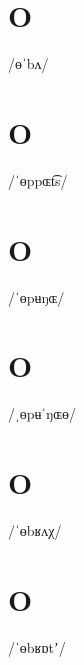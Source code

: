 \documentclass[10pt,a4paper,twoside]{book}
\begin{document}
\section*{O}

\begin{multicols}{3}
 {/ɵˈbʌ/} {}
\end{multicols}

\section*{O}

\begin{multicols}{3}
 {/ˈɵppɶt͡s/} {}
\end{multicols}

\section*{O}

\begin{multicols}{3}
 {/ˈɵpʉŋɶ/} {}
\end{multicols}

\section*{O}

\begin{multicols}{3}
 {/ˌɵpʉˈŋɶɵ/} {}
\end{multicols}

\section*{O}

\begin{multicols}{3}
 {/ˈɵbʁʌχ/} {}
\end{multicols}

\section*{O}

\begin{multicols}{3}
 {/ˈɵbʁɒtʼ/} {}
\end{multicols}
\end{document}
